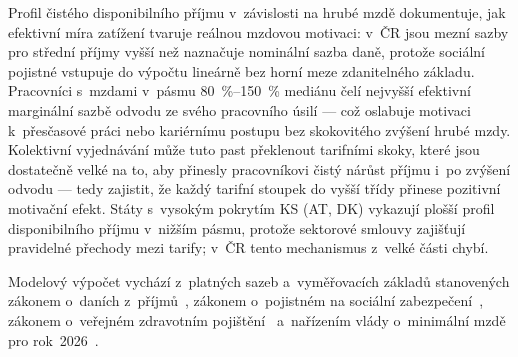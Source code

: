 Profil čistého disponibilního příjmu v~závislosti na hrubé mzdě dokumentuje, jak efektivní míra zatížení tvaruje reálnou mzdovou motivaci: v~ČR jsou mezní sazby pro střední příjmy vyšší než naznačuje nominální sazba daně, protože sociální pojistné vstupuje do výpočtu lineárně bez horní meze zdanitelného základu.
Pracovníci s~mzdami v~pásmu \SIrange{80}{150}{\percent} mediánu čelí nejvyšší efektivní marginální sazbě odvodu ze svého pracovního úsilí --- což oslabuje motivaci k~přesčasové práci nebo kariérnímu postupu bez skokovitého zvýšení hrubé mzdy.
Kolektivní vyjednávání může tuto past překlenout tarifními skoky, které jsou dostatečně velké na to, aby přinesly pracovníkovi čistý nárůst příjmu i~po zvýšení odvodu --- tedy zajistit, že každý tarifní stoupek do vyšší třídy přinese pozitivní motivační efekt.
Státy s~vysokým pokrytím \ac{KS} (AT, DK) vykazují plošší profil disponibilního příjmu v~nižším pásmu, protože sektorové smlouvy zajišťují pravidelné přechody mezi tarify; v~ČR tento mechanismus z~velké části chybí.

Modelový výpočet vychází z~platných sazeb a~vyměřovacích základů stanovených zákonem o~daních z~příjmů~\cite{zakon_zdp_1992}, zákonem o~pojistném na sociální zabezpečení~\cite{zakon_sp_1992}, zákonem o~veřejném zdravotním pojištění~\cite{zakon_zp_1992} a~nařízením vlády o~minimální mzdě pro rok~2026~\cite{nv_365_2025}.\par


